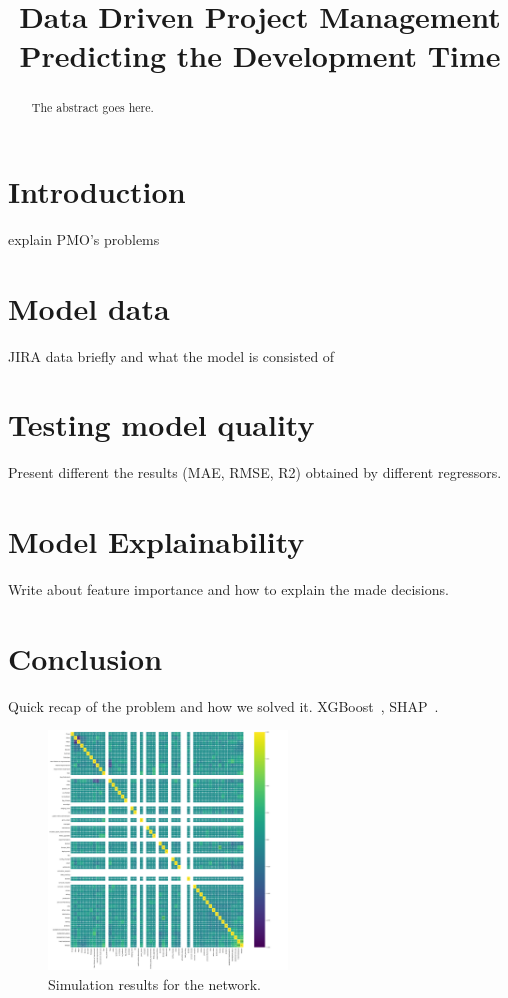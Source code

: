 \documentclass[conference,compsoc]{IEEEtran}
\begin{document}
\title{Data Driven Project Management \\ Predicting the Development Time}


\author{
}

\maketitle

\begin{abstract}
The abstract goes here.
\end{abstract}

\IEEEpeerreviewmaketitle

\section{Introduction}
explain PMO's problems
\section{Model data}
JIRA data briefly and what the model is consisted of

\section{Testing model quality}
Present different the results (MAE, RMSE, R2) obtained by different regressors.

\section{Model Explainability}
Write about feature importance and how to explain the made decisions.


\section{Conclusion}
Quick recap of the problem and how we solved it.
XGBoost~\cite{chen2016xgboost}, SHAP~\cite{lundberg2020local2global}.

\begin{figure}[!t]
\centering
\includegraphics[width=2.5in]{feature_correlation.png}
\caption{Simulation results for the network.}
\label{fig_sim}
\end{figure}
\end{document}
